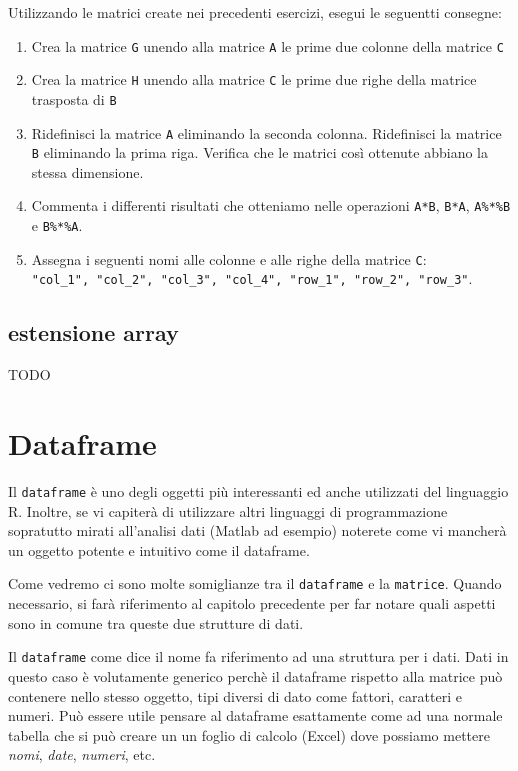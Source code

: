 \documentclass[
]{book}
\providecommand{\tightlist}{%
  \setlength{\itemsep}{0pt}\setlength{\parskip}{0pt}}
\begin{document}
Utilizzando le matrici create nei precedenti esercizi, esegui le seguentti consegne:

\begin{enumerate}
\def\labelenumi{\arabic{enumi}.}
\tightlist
\item
  Crea la matrice \texttt{G} unendo alla matrice \texttt{A} le prime due colonne della matrice \texttt{C}
\item
  Crea la matrice \texttt{H} unendo alla matrice \texttt{C} le prime due righe della matrice trasposta di \texttt{B}
\item
  Ridefinisci la matrice \texttt{A} eliminando la seconda colonna. Ridefinisci la matrice \texttt{B} eliminando la prima riga. Verifica che le matrici così ottenute abbiano la stessa dimensione.
\item
  Commenta i differenti risultati che otteniamo nelle operazioni \texttt{A*B}, \texttt{B*A}, \texttt{A\%*\%B} e \texttt{B\%*\%A}.
\item
  Assegna i seguenti nomi alle colonne e alle righe della matrice \texttt{C}: \texttt{"col\_1",\ "col\_2",\ "col\_3",\ "col\_4",\ "row\_1",\ "row\_2",\ "row\_3"}.
\end{enumerate}

\hypertarget{estensione-array}{%
\section{estensione array}\label{estensione-array}}

TODO

\hypertarget{dataframe}{%
\chapter{Dataframe}\label{dataframe}}

Il \texttt{dataframe} è uno degli oggetti più interessanti ed anche utilizzati del linguaggio R. Inoltre, se vi capiterà di utilizzare altri linguaggi di programmazione sopratutto mirati all'analisi dati (Matlab ad esempio) noterete come vi mancherà un oggetto potente e intuitivo come il dataframe.

Come vedremo ci sono molte somiglianze tra il \texttt{dataframe} e la \texttt{matrice}. Quando necessario, si farà riferimento al capitolo precedente per far notare quali aspetti sono in comune tra queste due strutture di dati.

Il \texttt{dataframe} come dice il nome fa riferimento ad una struttura per i dati. Dati in questo caso è volutamente generico perchè il dataframe rispetto alla matrice può contenere nello stesso oggetto, tipi diversi di dato come fattori, caratteri e numeri. Può essere utile pensare al dataframe esattamente come ad una normale tabella che si può creare un un foglio di calcolo (Excel) dove possiamo mettere \emph{nomi}, \emph{date}, \emph{numeri}, etc.
\end{document}

